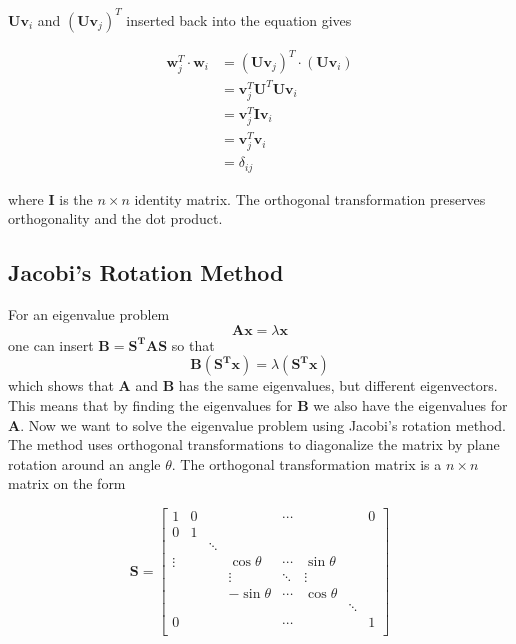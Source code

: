 \documentclass{article}
\begin{document}
$\mathbf{Uv}_i$ and $(\mathbf{Uv}_j)^T$ inserted back into the equation gives

\begin{equation*}
\begin{split}
\mathbf{w}_j^T\cdot \mathbf{w}_i&=(\mathbf{Uv}_j)^T\cdot (\mathbf{Uv}_i)\\
&=\mathbf{v}_j^T\mathbf{U}^T\mathbf{Uv}_i\\
&=\mathbf{v}_j^T\mathbf{I}\mathbf{v}_i\\
&=\mathbf{v}_j^T\mathbf{v}_i\\
&=\delta_{ij}
\end{split}
\end{equation*}

where $\mathbf{I}$ is the $n\times n$ identity matrix. The orthogonal transformation preserves orthogonality and the dot product.

\subsection{Jacobi's Rotation Method}
For an eigenvalue problem
$$\mathbf{Ax}=\lambda\mathbf{x}$$
one can insert $\mathbf{B}=\mathbf{S^TAS}$ so that
$$\mathbf{B(S^Tx)}=\lambda(\mathbf{S^Tx})$$
which shows that $\mathbf{A}$ and $\mathbf{B}$ has the same eigenvalues, but different eigenvectors. This means that by finding the eigenvalues for $\mathbf{B}$ we also have the eigenvalues for $\mathbf{A}$.
\vskip0.5cm
Now we want to solve the eigenvalue problem using Jacobi's rotation method. The method uses orthogonal transformations to diagonalize the matrix by plane rotation around an angle $\theta$. The orthogonal transformation matrix is a $n\times n$ matrix on the form

\begin{equation*}
\mathbf{S}=\begin{bmatrix}
1 & 0 & & & \cdots & & & 0\\
0 & 1 & & & & & \\
 &  &\ddots & & & & &\\
\vdots &  & & \cos\theta & \cdots & \sin\theta & &\\
 & & &\vdots & \ddots & \vdots & &\\
 & & & -\sin\theta & \cdots & \cos\theta & & \\
 & & & & & & \ddots & \\
0 &  & & & \cdots  & & & 1\\
\end{bmatrix}
\end{equation*}
\end{document}
